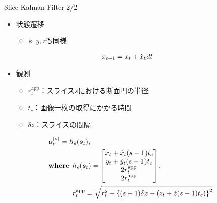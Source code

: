 \begin{frame}[noframenumbering]{Slice Kalman Filter 2/2}
    \begin{itemize}
        \item 状態遷移
        \begin{itemize}
            \item ※ $y,z$も同様
        \end{itemize}
    \end{itemize}
    \begin{equation}
        \notag
        \begin{aligned}
            & x_{t+1} = x_t + \dot{x}_t dt
        \end{aligned}
    \end{equation}
    \begin{itemize}
        \item 観測
        \begin{itemize}
            \item $r_t^{\text{app}}$：スライス$s$における断面円の半径
            \item $t_c$：画像一枚の取得にかかる時間
            \item $\delta z$：スライスの間隔
        \end{itemize}
    \end{itemize}
    \begin{equation}
        \notag
        \begin{aligned}
            & \bm{o}_t^{(s)} = h_s(\bm{s}_t),
            \\ & \textbf{where } h_s(\bm{s}_t) = \begin{bmatrix}
                x_t + \dot{x}_t (s-1) t_c
                \\ y_t + \dot{y}_t (s-1) t_c
                \\ 2 r_t^{\text{app}}
                \\ 2 r_t^{\text{app}}
            \end{bmatrix},
            \\ & \phantom{\textbf{where }} r_t^{\text{app}} = \sqrt{r_t^2 - \left\{(s-1) \delta z - (z_t + \dot{z} (s-1) t_c)\right\}^2}
        \end{aligned}
    \end{equation}
\end{frame}